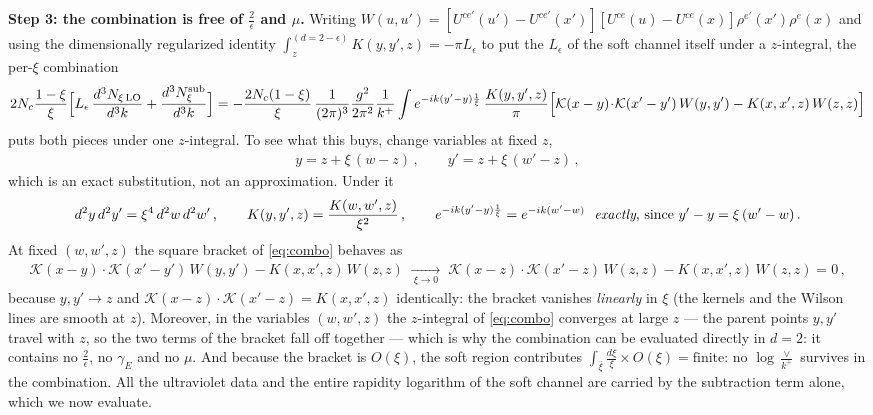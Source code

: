 \documentclass[10pt]{article}
\newcommand{\Leps}{L_{\epsilon}}
\newcommand{\KK}{\mathcal K(x-y)\!\cdot\!\mathcal K(x'-y')}
\begin{document}
\textbf{Step 3: the combination is free of $\frac{2}{\epsilon}$ and $\mu$.} Writing
$W(u,u')=[U^{ce'}(u')-U^{ce'}(x')][U^{ce}(u)-U^{ce}(x)]\rho^{e'}(x')\rho^{e}(x)$ and using the
dimensionally regularized identity $\int_{z}^{(d=2-\epsilon)}K(y,y',z)=-\pi\Leps$ to put the
$\Leps$ of the soft channel itself under a $z$-integral, the per-$\xi$ combination
\begin{align}\label{eq:combo}
2N_c\frac{1-\xi}{\xi}\Big[\Leps\,\frac{d^{3}N_{\xi\,\rm LO}}{d^{3}k}+\frac{d^{3}N^{\rm sub}_{\xi}}{d^{3}k}\Big]
=-\frac{2N_c(1-\xi)}{\xi}\,\frac{1}{(2\pi)^{3}}\frac{g^{2}}{2\pi^{2}}\frac{1}{k^{+}}
\int e^{-ik(y'-y)\frac1\xi}\,\frac{K(y,y',z)}{\pi}\Big[\KK\,W(y,y')-K(x,x',z)\,W(z,z)\Big]
\end{align}
puts both pieces under one $z$-integral. To see what this buys, change variables at fixed $z$,
\begin{align}\label{eq:rescale}
y=z+\xi\,(w-z)\,,\qquad y'=z+\xi\,(w'-z)\,,
\end{align}
which is an exact substitution, not an approximation. Under it
\begin{align}\label{eq:rescalerules}
d^{2}y\,d^{2}y'=\xi^{4}\,d^{2}w\,d^{2}w'\,,\qquad
K(y,y',z)=\frac{K(w,w',z)}{\xi^{2}}\,,\qquad
e^{-ik(y'-y)\frac1\xi}=e^{-ik(w'-w)}\ \ \text{\emph{exactly}, since } y'-y=\xi\,(w'-w)\,.
\end{align}
At fixed $(w,w',z)$ the square bracket of \eqref{eq:combo} behaves as
\begin{align}
\mathcal K(x-y)\!\cdot\!\mathcal K(x'-y')\,W(y,y')-K(x,x',z)\,W(z,z)
\;\xrightarrow[\ \xi\to0\ ]{}\;
\mathcal K(x-z)\!\cdot\!\mathcal K(x'-z)\,W(z,z)-K(x,x',z)\,W(z,z)=0\,,
\end{align}
because $y,y'\to z$ and $\mathcal K(x-z)\cdot\mathcal K(x'-z)=K(x,x',z)$ identically: the bracket
vanishes \emph{linearly} in $\xi$ (the kernels and the Wilson lines are smooth at $z$). Moreover,
in the variables $(w,w',z)$ the $z$-integral of \eqref{eq:combo} converges at large $z$ --- the
parent points $y,y'$ travel with $z$, so the two terms of the bracket fall off together --- which
is why the combination can be evaluated directly in $d=2$: it contains no $\frac{2}{\epsilon}$, no
$\gamma_{E}$ and no $\mu$. And because the bracket is $O(\xi)$, the soft region contributes
$\int_{\bar\xi}\frac{d\xi}{\xi}\times O(\xi)=\text{finite}$: no $\log\frac{\vee}{k^{+}}$ survives
in the combination. All the ultraviolet data and the entire rapidity logarithm of the soft channel
are carried by the subtraction term alone, which we now evaluate.
\end{document}
